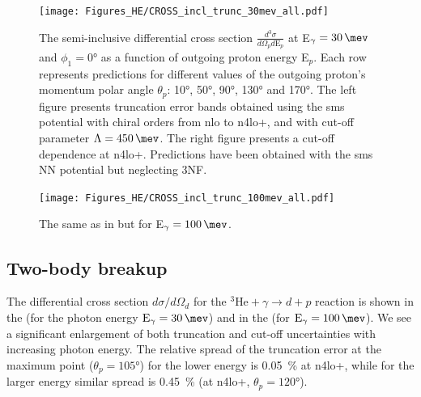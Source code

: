         \begin{figure}[h]
            \begin{center}
            \texttt{[image: Figures\_HE/CROSS\_incl\_trunc\_30mev\_all.pdf]}
            \end{center}
            \caption{The semi-inclusive differential cross section $\frac{d^3\sigma}{d\Omega_p d\text{E}_p}$
            at E$_\gamma = \SI{30}{\mev}$ and $\phi_1 = \ang{0}$ as a function of outgoing proton energy E$_p$. Each row represents 
            predictions for different values of the outgoing proton's momentum polar angle $\theta_p$: 
            \ang{10}, \ang{50}, \ang{90}, \ang{130} and \ang{170}.
            The left figure presents truncation error bands obtained using the \gls{sms} potential
            with chiral orders from \gls{nlo} to \gls{n4lo+}, and with
            cut-off parameter $\Lambda=\SI{450}{\mev}$.
            The right figure presents a cut-off dependence at \gls{n4lo+}.
            Predictions have been obtained with the \gls{sms} NN potential but neglecting 3NF.}
            \label{CROSS_HE_INCL_30MEV_2NF}
        \end{figure}

        \begin{figure}[h]
            \begin{center}
            \texttt{[image: Figures\_HE/CROSS\_incl\_trunc\_100mev\_all.pdf]}
            \end{center}
            \caption{The same as in  but for E$_\gamma = \SI{100}{\mev}$.}
            \label{CROSS_HE_INCL_100MEV_2NF}
        \end{figure}


\clearpage


\subsection{Two-body breakup}

    The differential cross section $d\sigma/d\Omega_d$ for the $^3\text{He} + \gamma \rightarrow d + p$ reaction
    is shown in the  (for the photon energy $\text{E}_\gamma = \SI{30}{\mev}$)
    and in the  (for $\text{E}_\gamma = \SI{100}{\mev}$).
    We see a significant enlargement of both truncation and cut-off uncertainties
    with increasing photon energy.
    The relative spread of the truncation error at the maximum point ($\theta_p = \ang{105}$)
    for the lower energy is \SI{0.05}{\percent} at \gls{n4lo+}, while for the larger energy
    similar spread is \SI{0.45}{\percent} (at \gls{n4lo+}, $\theta_p = \ang{120}$).

